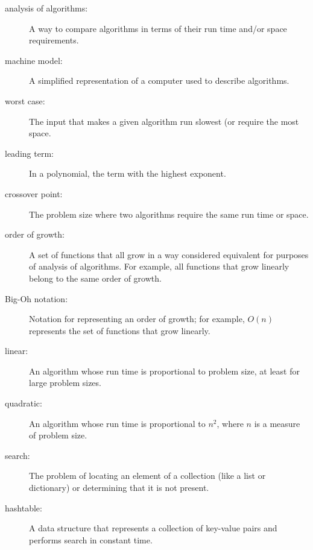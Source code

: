 \begin{description}

\item[]

\item[analysis of algorithms:] A way to compare algorithms in terms of
their run time and/or space requirements.

\item[machine model:] A simplified representation of a computer used
to describe algorithms.

\item[worst case:] The input that makes a given algorithm run slowest (or
require the most space.

\item[leading term:] In a polynomial, the term with the highest exponent.

\item[crossover point:] The problem size where two algorithms require
the same run time or space.

\item[order of growth:] A set of functions that all grow in a way
considered equivalent for purposes of analysis of algorithms.
For example, all functions that grow linearly belong to the same
order of growth.

\item[Big-Oh notation:] Notation for representing an order of growth;
for example, $O(n)$ represents the set of functions that grow
linearly.

\item[linear:] An algorithm whose run time is proportional to
problem size, at least for large problem sizes.

\item[quadratic:] An algorithm whose run time is proportional to
$n^2$, where $n$ is a measure of problem size.

\item[search:] The problem of locating an element of a collection
(like a list or dictionary) or determining that it is not present.

\item[hashtable:] A data structure that represents a collection of
key-value pairs and performs search in constant time.

\end{description}
